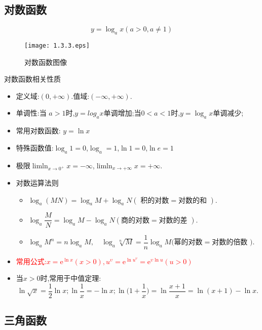 \documentclass[8pt a4paper, oneside, UTF8]{ctexbook}  %
\begin{document}
\begin{sloppypar}
    \subsection{对数函数}
    $$
        y=\log_a x (a>0,a \neq 1)
    $$
    \begin{figure}[H]
        \centering \texttt{[image: 1.3.3.eps]} \caption{对数函数图像}
    \end{figure}
    \begin{criterion}{对数函数相关性质}{}
        \begin{itemize}
            \item 定义域:$(0,+\infty)$.值域:$(-\infty,+\infty)$.
            \item 单调性:当 $a>1$时,$y=log_a x$单调增加;当$0<a<1$时,$y=\log_a x$单调减少;
            \item 常用对数函数: $y=\ln x$
            \item 特殊函数值:$\log_a 1=0$,$\log_a=1$,$\ln 1=0$,$\ln e=1$
            \item 极限$\operatorname*{lim ln}_{x\to0^{+}}x=-\infty$,$\operatorname*{lim ln}_{x\to+\infty}x=+\infty$.
            \item  {} 对数运算法则\label{dshs}
                  \begin{itemize}
                      \item $\log_{a}\left(MN\right)=\log_{a}M+\log_{a}N\left(\text{ 积的对数}=\text{对数的和 }\right).$
                      \item $\log_{a}\dfrac{M}{N}=\log_{a}M-\log_{a}N\left(\text{商的对数}=\text{对数的差 }\right).$
                      \item $\log_aM^n=n\log_aM,\quad\log_a\sqrt[n]{M}=\dfrac1n\log_aM\text{(幂的对数}=\text{对数的倍数 }).$
                  \end{itemize}
            \item \textcolor{red}{常用公式:$x=\mathrm{e}^{\ln x}\left(x>0\right),u^{\upsilon}=\mathrm{e}^{\ln u^v}=\mathrm{e}^{\upsilon\ln u}\left(u>0\right)$}
            \item 当$x>0$时,常用于中值定理:
                  $$
                      \ln\sqrt{x}=\frac{1}{2}\ln x;\ln\frac{1}{x}=-\ln x;\ln\biggl(1+\frac{1}{x}\biggr)=\ln\frac{x+1}{x}=\ln(x+1)-\ln x.
                  $$
        \end{itemize}
    \end{criterion}
    \subsection{三角函数}

\end{sloppypar}
\end{document}
